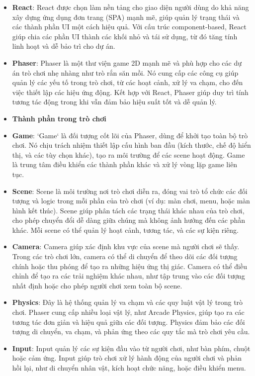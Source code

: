 \documentclass[a4paper, 12pt]{article}
\begin{document}
\begin{itemize}
    \item \textbf{React}: React được chọn làm nền tảng cho giao diện người dùng do khả năng xây dựng ứng dụng đơn trang (SPA) mạnh mẽ, giúp quản lý trạng thái và các thành phần UI một cách hiệu quả. Với cấu trúc component-based, React giúp chia các phần UI thành các khối nhỏ và tái sử dụng, từ đó tăng tính linh hoạt và dễ bảo trì cho dự án.

    \item \textbf{Phaser}: Phaser là một thư viện game 2D mạnh mẽ và phù hợp cho các dự án trò chơi nhẹ nhàng như trò rắn săn mồi. Nó cung cấp các công cụ giúp quản lý các yếu tố trong trò chơi, từ các hoạt cảnh, xử lý va chạm, cho đến việc thiết lập các hiệu ứng động. Kết hợp với React, Phaser giúp duy trì tính tương tác động trong khi vẫn đảm bảo hiệu suất tốt và dễ quản lý.

    \item \textbf{Thành phần trong trò chơi}

     \item \textbf{Game}: `Game` là đối tượng cốt lõi của Phaser, dùng để khởi tạo toàn bộ trò chơi. Nó chịu trách nhiệm thiết lập cấu hình ban đầu (kích thước, chế độ hiển thị, và các tùy chọn khác), tạo ra môi trường để các scene hoạt động. Game là trung tâm điều khiển các thành phần khác và xử lý vòng lặp game liên tục.

    \item \textbf{Scene}: Scene là môi trường nơi trò chơi diễn ra, đóng vai trò tổ chức các đối tượng và logic trong mỗi phần của trò chơi (ví dụ: màn chơi, menu, hoặc màn hình kết thúc). Scene giúp phân tách các trạng thái khác nhau của trò chơi, cho phép chuyển đổi dễ dàng giữa chúng mà không ảnh hưởng đến các phần khác. Mỗi scene có thể quản lý hoạt cảnh, tương tác, và các sự kiện riêng.

    \item \textbf{Camera}: Camera giúp xác định khu vực của scene mà người chơi sẽ thấy. Trong các trò chơi lớn, camera có thể di chuyển để theo dõi các đối tượng chính hoặc thu phóng để tạo ra những hiệu ứng thị giác. Camera có thể điều chỉnh để tạo ra các trải nghiệm khác nhau, như tập trung vào các đối tượng nhất định hoặc cho phép người chơi xem toàn bộ scene.

    \item \textbf{Physics}: Đây là hệ thống quản lý va chạm và các quy luật vật lý trong trò chơi. Phaser cung cấp nhiều loại vật lý, như Arcade Physics, giúp tạo ra các tương tác đơn giản và hiệu quả giữa các đối tượng. Physics đảm bảo các đối tượng di chuyển, va chạm, và phản ứng theo các quy tắc mà trò chơi yêu cầu.

    \item \textbf{Input}: Input quản lý các sự kiện đầu vào từ người chơi, như bàn phím, chuột hoặc cảm ứng. Input giúp trò chơi xử lý hành động của người chơi và phản hồi lại, như di chuyển nhân vật, kích hoạt chức năng, hoặc điều khiển menu.
\end{itemize}
\end{document}
